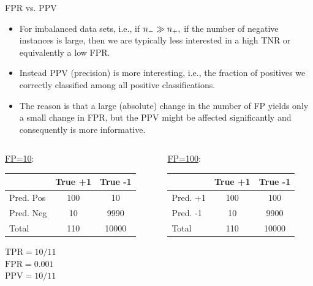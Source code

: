 	\begin{frame}{FPR vs. PPV}
			\small	
		\begin{itemize}
%			
			\item For imbalanced data sets, i.e., if $n_{-} \gg n_{+},$ if the number of negative instances is large, then we are typically less interested in a high TNR or equivalently a low FPR.
%			
			\item Instead PPV (precision) is more interesting, i.e., the fraction of positives we correctly classified among all positive classifications. 
%			
			\item The reason is that a large (absolute) change in the number of FP yields only a small change in FPR, but the PPV might be affected significantly and consequently is more informative.
%			
		\end{itemize}
	
		
		\begin{columns}
			\footnotesize
			\begin{column}{0.45\textwidth}
				\centering
				\underline{FP=10}:\\
				\lz
				{
					\tiny
					\centering
					\tiny
					\begin{tabular}{|l|c|c|}
						\hline
						& True +1 & True -1 \\ \hline
						Pred. Pos & 100            & 10            \\ \hline
						Pred. Neg & 10            & 9990           \\ \hline
						Total  & 110            & 10000           \\ \hline
					\end{tabular}
				}
				
				\medskip
				$\text{TPR} = 10/11$\\
				$\text{FPR} = 0.001$\\
				$\text{PPV} = 10/11$
			\end{column}
			\begin{column}{0.45\textwidth}
				\centering
				\underline{FP=100}:\\
				\lz
				{
					\tiny
					\begin{tabular}{|l|c|c|}
						\hline
						& True +1 & True -1 \\ \hline
						Pred. +1 & 100            & 100            \\ \hline
						Pred. -1 & 10            & 9900           \\ \hline
						Total  & 110            & 10000           \\ \hline
					\end{tabular}
				}
				

\end{column}
\end{columns}
\end{frame}
